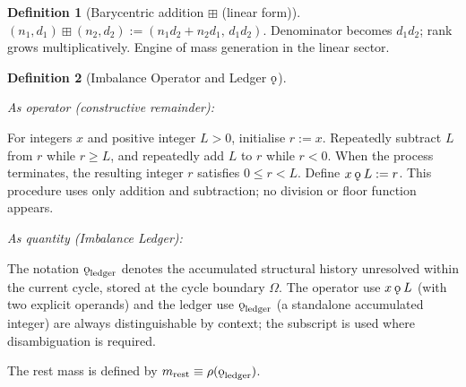 \documentclass[11pt, letterpaper]{article}
\newcommand{\bplus}{\boxplus}
\newcommand{\rank}{\rho}
\newcommand{\koppa}{\mathbin{\text{\rm\k{o}}}}
\theoremstyle{definition}
\newtheorem{definition}{Definition}[section]
\theoremstyle{plain}
\begin{document}
\begin{definition}[Barycentric addition $\bplus$ (linear form)]
\label{def:bplus}
$(n_1,d_1)\bplus(n_2,d_2):=(n_1 d_2+n_2 d_1,\,d_1 d_2)$.
Denominator becomes $d_1 d_2$; rank grows multiplicatively.  Engine of mass
generation in the linear sector.
\end{definition}

\begin{definition}[Imbalance Operator and Ledger $\koppa$]\label{def:koppa}
\begin{rsbox}
\textit{As operator (constructive remainder):}

For integers $x$ and positive integer $L>0$, initialise $r:=x$.  Repeatedly
subtract $L$ from $r$ while $r\geq L$, and repeatedly add $L$ to $r$ while
$r<0$.  When the process terminates, the resulting integer $r$ satisfies
$0\leq r<L$.  Define $x\koppa L:=r$.  This procedure uses only addition and
subtraction; no division or floor function appears.

\textit{As quantity (Imbalance Ledger):}

The notation $\koppa_{\mathrm{ledger}}$ denotes the accumulated structural
history unresolved within the current cycle, stored at the cycle boundary
$\Omega$.  The operator use $x\koppa L$ (with two explicit operands) and the
ledger use $\koppa_{\mathrm{ledger}}$ (a standalone accumulated integer) are
always distinguishable by context; the subscript is used where disambiguation
is required.

The rest mass is defined by $m_{\mathrm{rest}}\equiv\rank(\koppa_{\mathrm{ledger}})$.
\end{rsbox}
\end{definition}
\end{document}
